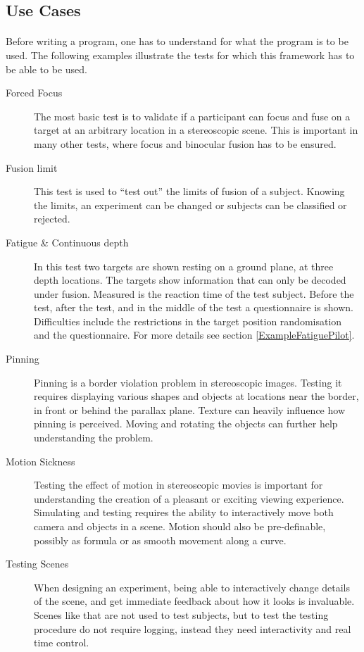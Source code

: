\subsection{Use Cases}
\paragraph{}
Before writing a program, one has to understand for what the program is to be used. The following examples illustrate the tests for which this framework has to be able to be used.

\begin{description}
\item[Forced Focus]
The most basic test is to validate if a participant can focus and fuse on a target at an arbitrary location in a stereoscopic scene.
This is important in many other tests, where focus and binocular fusion has to be ensured.

\item[Fusion limit]
This test is used to ``test out'' the limits of fusion of a subject.
Knowing the limits, an experiment can be changed or subjects can be classified or rejected.

\item[Fatigue \& Continuous depth]
In this test two targets are shown resting on a ground plane, at three depth locations.
The targets show information that can only be decoded under fusion.
Measured is the reaction time of the test subject.
Before the test, after the test, and in the middle of the test a questionnaire is shown.
Difficulties include the restrictions in the target position randomisation and the questionnaire.
For more details see section \ref{ExampleFatiguePilot}.

\item[Pinning]
Pinning is a border violation problem in stereoscopic images.
Testing it requires displaying various shapes and objects at locations near the border, in front or behind the parallax plane.
Texture can heavily influence how pinning is perceived.
Moving and rotating the objects can further help understanding the problem.

\item[Motion Sickness]
Testing the effect of motion in stereoscopic movies is important for understanding the creation of a pleasant or exciting viewing experience.
Simulating and testing requires the ability to interactively move both camera and objects in a scene.
Motion should also be pre-definable, possibly as formula or as smooth movement along a curve.

\item[Testing Scenes]
When designing an experiment, being able to interactively change details of the scene, and get immediate feedback about how it looks is invaluable.
Scenes like that are not used to test subjects, but to test the testing procedure do not require logging, instead they need interactivity and real time control.

\end{description}


